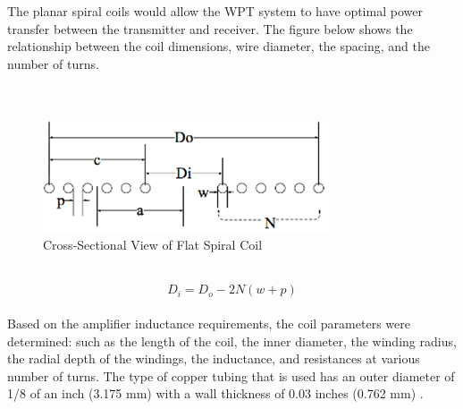 \documentclass[12pt]{article}
\begin{document}
\indent
The planar spiral coils would allow the WPT system to have optimal power transfer between the transmitter and receiver. \cite{optCoilSize} The figure below shows the relationship between the coil dimensions, wire diameter, the spacing, and the number of turns.\\
\hfill \\
\pagebreak
\hfill \\
\hfill
\begin{figure}[h!]
\centering
\includegraphics[width=0.75\linewidth]{cross_spiral}
\caption{Cross-Sectional View of Flat Spiral Coil \cite{optCoilSize}}
\end{figure}
\hfill \\
\hfill
\begin{equation}
D_i = D_o - 2N(w+p)
\end{equation}
\hfill \\
%
\indent
Based on the amplifier inductance requirements, the coil parameters were determined: such as the length of the coil, the inner diameter, the winding radius, the radial depth of the windings, the inductance, and resistances at various number of turns. The type of copper tubing that is used has an outer diameter of 1/8 of an inch (3.175 mm) with a wall thickness of 0.03 inches (0.762 mm) \cite{mcmaster}.
\end{document}
